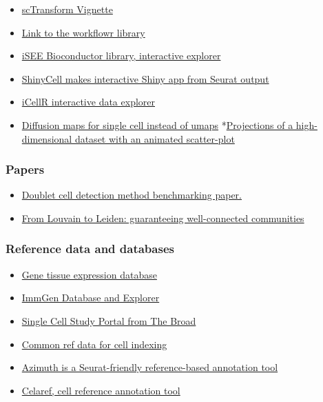 \documentclass[
]{book}
\providecommand{\tightlist}{%
  \setlength{\itemsep}{0pt}\setlength{\parskip}{0pt}}
\begin{document}
\begin{itemize}
\tightlist
\item
  \href{https://satijalab.org/seurat/articles/sctransform_vignette.html}{scTransform Vignette}
\item
  \href{https://github.com/jdblischak/workflowr}{Link to the workflowr library}
\item
  \href{https://bioconductor.org/packages/release/bioc/html/iSEE.html}{iSEE Bioconductor library, interactive explorer}
\item
  \href{https://github.com/SGDDNB/ShinyCell}{ShinyCell makes interactive Shiny app from Seurat output}
\item
  \href{https://github.com/rezakj/iCellR}{iCellR interactive data explorer}
\item
  \href{https://www.helmholtz-munich.de/icb/research/groups/marr-lab/software/destiny/index.html}{Diffusion maps for single cell instead of umaps}
  *\href{https://logarithmic.net/langevitour/}{Projections of a high-dimensional dataset with an animated scatter-plot}
\end{itemize}

\subsubsection{Papers}\label{papers}

\begin{itemize}
\tightlist
\item
  \href{https://www.cell.com/cell-systems/fulltext/S2405-4712(20)30459-2}{Doublet cell detection method benchmarking paper.}
\item
  \href{https://www.nature.com/articles/s41598-019-41695-z}{From Louvain to Leiden: guaranteeing well-connected communities}
\end{itemize}

\subsubsection{Reference data and databases}\label{reference-data-and-databases}

\begin{itemize}
\tightlist
\item
  \href{https://gtexportal.org/home/}{Gene tissue expression database}
\item
  \href{https://www.immgen.org/Databrowser19/DatabrowserPage.html}{ImmGen Database and Explorer}
\item
  \href{https://singlecell.broadinstitute.org/single_cell}{Single Cell Study Portal from The Broad}
\item
  \href{http://bioconductor.org/packages/release/data/experiment/vignettes/celldex/inst/doc/userguide.html\#2_General-purpose_references}{Common ref data for cell indexing}
\item
  \href{https://azimuth.hubmapconsortium.org/references/\#Human\%20-\%20PBMC}{Azimuth is a Seurat-friendly reference-based annotation tool}
\item
  \href{https://www.bioconductor.org/packages/release/bioc/html/celaref.html}{Celaref, cell reference annotation tool}
\end{itemize}
\end{document}
